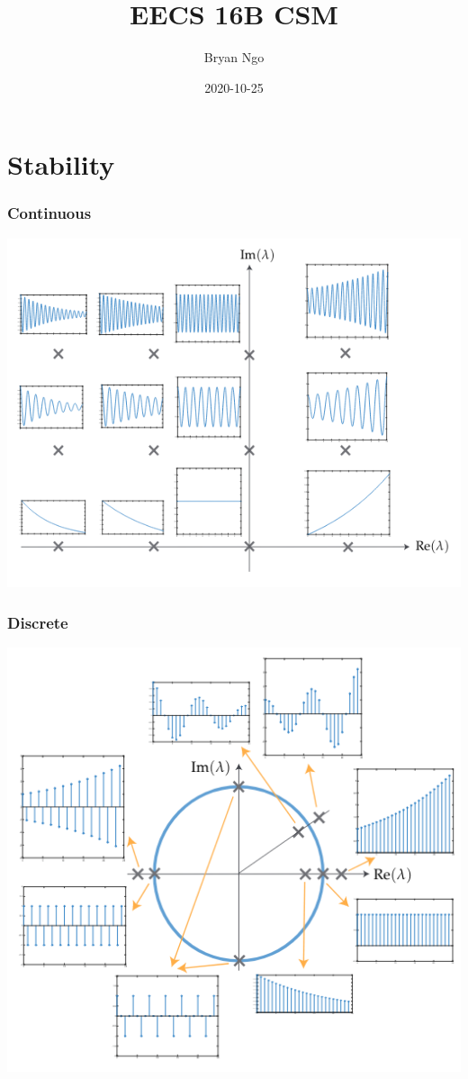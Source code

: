 \documentclass[aspectratio=169]{beamer}
\title{EECS 16B CSM}
\author{Bryan Ngo}
\date{2020-10-25}
\institute{UC Berkeley}
\begin{document}
\begin{frame}
    \maketitle
\end{frame}

\section{Stability}

\begin{frame}
    \frametitle{Continuous}
    
    \centering
    \includegraphics[width=\textheight]{../2020-10-19/continuous.png}
\end{frame}

\begin{frame}
    \frametitle{Discrete}
    
    \centering
    \includegraphics[width=\textheight]{../2020-10-19/discrete.png}
\end{frame}
\end{document}
